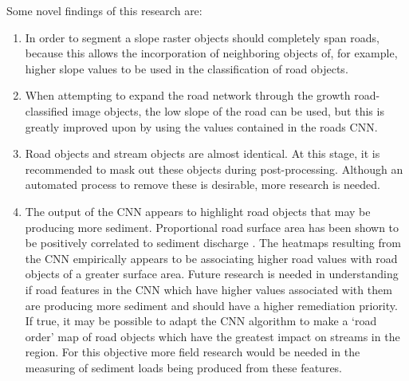 \documentclass[remotesensing,article,submit,pdftex,moreauthors]{Definitions/mdpi}
\begin{document}
Some novel findings of this research are:
\begin{enumerate}[]
\item In order to segment a slope raster objects should completely span roads, because this allows the incorporation of neighboring objects of, for example, higher slope values to be used in the classification of road objects.

\item When attempting to expand the road network through the growth road-classified image objects, the low slope of the road can be used, but this is greatly improved upon by using the values contained in the roads CNN.  

\item Road objects and stream objects are almost identical. At this stage, it is recommended to mask out these objects during post-processing. Although an automated process to remove these is desirable, more research is needed.

\item The output of the CNN appears to highlight road objects that may be producing more sediment. Proportional road surface area has been shown to be positively correlated to sediment discharge \cite{reid}. The heatmaps resulting from the CNN empirically appears to be associating higher road values with road objects of a greater surface area. Future research is needed in understanding if road features in the CNN which have higher values associated with them are producing more sediment and should have a higher remediation priority. If true, it may be possible to adapt the CNN algorithm to make a ‘road order’ map of road objects which have the greatest impact on streams in the region. For this objective more field research would be needed in the measuring of sediment loads being produced from these features.  
\end{enumerate}

\vspace{6pt} 


\end{document}
